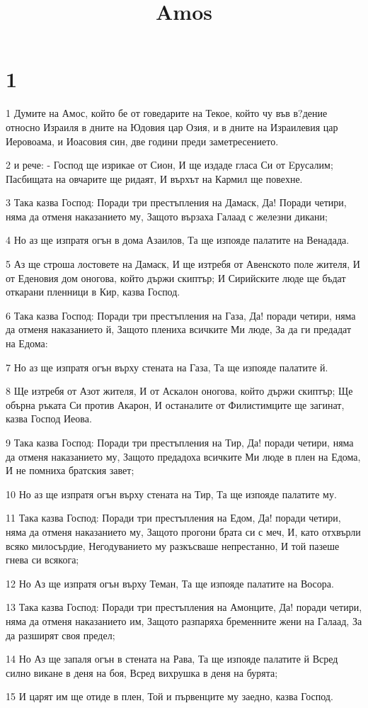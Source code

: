 

\title{Amos}


\chapter{1}

\par 1 Думите на Амос, който бе от говедарите на Текое, който чу във в?дение относно Израиля в дните на Юдовия цар Озия, и в дните на Израилевия цар Иеровоама, и Иоасовия син, две години преди заметресението.
\par 2 и рече: -  Господ ще изрикае от Сион,  И ще издаде гласа Си от Eрусалим; Пасбищата на овчарите ще ридаят, И върхът на Кармил ще повехне.
\par 3 Така казва Господ: Поради три престъпления на Дамаск, Да! Поради четири, няма да отменя наказанието му, Защото вързаха Галаад с железни дикани;
\par 4 Но аз ще изпратя огън в дома Азаилов, Та ще изпояде палатите на Венадада.
\par 5 Аз ще строша лостовете на Дамаск, И ще изтребя от Авенското поле жителя, И от Еденовия дом оногова, който държи скиптър; И Сирийските люде ще бъдат откарани пленници в Кир, казва Господ.
\par 6 Така казва Господ: Поради три престъпления на Газа, Да! поради четири, няма да отменя наказанието й, Защото плениха всичките Ми люде, За да ги предадат на Едома:
\par 7 Но аз ще изпратя огън върху стената на Газа, Та ще изпояде палатите й.
\par 8 Ще изтребя от Азот жителя, И от Аскалон оногова, който държи скиптър; Ще обърна ръката Си против Акарон, И останалите от Филистимците ще загинат, казва Господ Иеова.
\par 9 Така казва Господ: Поради три престъпления на Тир, Да! поради четири, няма да отменя наказанието му, Защото предадоха всичките Ми люде в плен на Едома, И не помниха братския завет;
\par 10 Но аз ще изпратя огън върху стената на Тир, Та ще изпояде палатите му.
\par 11 Така казва Господ: Поради три престъпления на Едом, Да! поради четири, няма да отменя наказанието му, Защото прогони брата си с меч, И, като отхвърли всяко милосърдие, Негодуванието му разкъсваше непрестанно, И той пазеше гнева си всякога;
\par 12 Но Аз ще изпратя огън върху Теман, Та ще изпояде палатите на Восора.
\par 13 Така казва Господ: Поради три престъпления на Амонците, Да! поради четири, няма да отменя наказанието им, Защото разпаряха бременните жени на Галаад, За да разширят своя предел;
\par 14 Но Аз ще запаля огън в стената на Рава, Та ще изпояде палатите й Всред силно викане в деня на боя, Всред вихрушка в деня на бурята;
\par 15 И царят им ще отиде в плен, Той и първенците му заедно, казва Господ.

